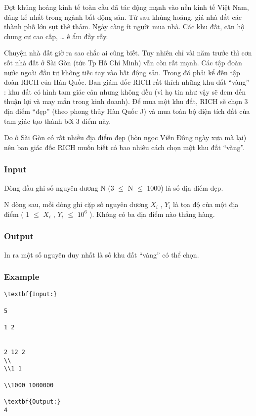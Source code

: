 



   Đợt khủng hoảng kinh tế toàn cầu đã tác động mạnh vào nền kinh tế Việt Nam, đáng kể nhất trong ngành bất động sản. Từ sau khủng hoảng, giá nhà đất các thành phố lớn sụt thê thảm. Ngày càng ít người mua nhà. Các khu đất, căn hộ chung cư cao cấp, … ế ẩm đầy rẫy.  

   Chuyện nhà đất giờ ra sao chắc ai cũng biết. Tuy nhiên chỉ vài năm trước thì cơn sốt nhà đất ở Sài Gòn (tức Tp Hồ Chí Minh) vẫn còn rất mạnh. Các tập đoàn nước ngoài đầu tư không tiếc tay vào bất động sản. Trong đó phải kể đến tập đoàn RICH của Hàn Quốc. Ban giám đốc RICH rất thích những khu đất “vàng” : khu đất có hình tam giác cân nhưng không đều (vì họ tin như vậy sẽ đem đến thuận lợi và may mắn trong kinh doanh). Để mua một khu đất, RICH sẽ chọn 3 địa điểm “đẹp” (theo phong thủy Hàn Quốc J) và mua toàn bộ diện tích đất của tam giác tạo thành bởi 3 điểm này.  

   Do ở Sài Gòn có rất nhiều địa điểm đẹp (hòn ngọc Viễn Đông ngày xưa mà lại) nên ban giác đốc RICH muốn biết có bao nhiêu cách chọn một khu đất “vàng”.  

\subsubsection{   Input  }

   Dòng đầu ghi số nguyên dương N (3  $\le$  N  $\le$  1000) là số địa điểm đẹp.  

   N dòng sau, mỗi dòng ghi cặp số nguyên dương $X_{i}$   , $Y_{i}$   là tọa độ của một địa điểm ( 1  $\le$  $X_{i}$   , $Y_{i}$    $\le$  $10^{6}$   ). Không có ba địa điểm nào thẳng hàng.  

\subsubsection{   Output  }

   In ra một số nguyên duy nhất là số khu đất “vàng” có thể chọn.  

\subsubsection{   Example  }
\begin{verbatim}
\textbf{Input:}

5

1 2


2 12 2
\\
\\1 1

\\1000 1000000

\textbf{Output:}
4
\end{verbatim}
